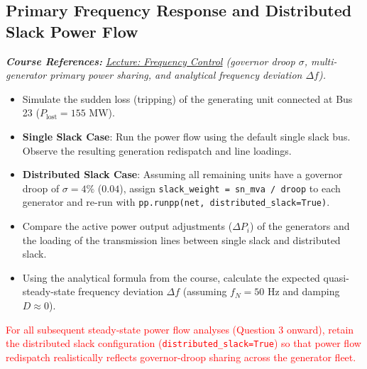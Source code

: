 \documentclass[11pt]{article}
\begin{document}
  \subsection{Primary Frequency Response and Distributed Slack Power Flow}
  \noindent\textit{\textbf{Course References:} \href{https://github.com/bcornelusse/ELEC0447-analysis-power-systems/blob/master/Lectures/frequency_control/main.pdf}{Lecture: Frequency Control} (governor droop $\sigma$, multi-generator primary power sharing, and analytical frequency deviation $\Delta f$).}
  \begin{itemize}
    \item Simulate the sudden loss (tripping) of the generating unit connected at Bus 23 ($P_{\text{lost}} = 155\text{ MW}$).
    \item \textbf{Single Slack Case}: Run the power flow using the default single slack bus. Observe the resulting generation redispatch and line loadings.
    \item \textbf{Distributed Slack Case}: Assuming all remaining units have a governor droop of $\sigma = 4\%$ ($0.04$), assign \lstinline|slack_weight = sn_mva / droop| to each generator and re-run with \lstinline|pp.runpp(net, distributed_slack=True)|.
    \item Compare the active power output adjustments ($\Delta P_i$) of the generators and the loading of the transmission lines between single slack and distributed slack.
    \item Using the analytical formula from the course, calculate the expected quasi-steady-state frequency deviation $\Delta f$ (assuming $f_N = 50\text{ Hz}$ and damping $D \approx 0$).
  \end{itemize}
  \textcolor{red}{For all subsequent steady-state power flow analyses (Question 3 onward), retain the distributed slack configuration (\lstinline|distributed_slack=True|) so that power flow redispatch realistically reflects governor-droop sharing across the generator fleet.}
\end{document}
